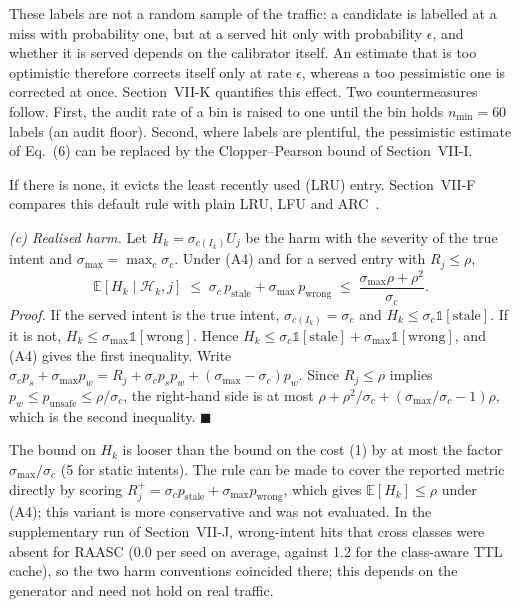 These labels are not a random sample of the traffic: a candidate is labelled at a miss with probability one, but at a served hit only with probability $\epsilon$, and whether it is served depends on the calibrator itself. An estimate that is too optimistic therefore corrects itself only at rate $\epsilon$, whereas a too pessimistic one is corrected at once. Section~VII-K quantifies this effect. Two countermeasures follow. First, the audit rate of a bin is raised to one until the bin holds $n_{\min}=60$ labels (an audit floor). Second, where labels are plentiful, the pessimistic estimate of Eq.~(6) can be replaced by the Clopper--Pearson bound of Section~VII-I.

If there is none, it evicts the least recently used (LRU) entry. Section~VII-F compares this default rule with plain LRU, LFU and ARC~\cite{megiddo2003arc}.


\emph{(c) Realised harm.} Let $H_k=\sigma_{c(I_k)}U_j$ be the harm with the severity of the true intent and $\sigma_{\max}=\max_c\sigma_c$. Under (A4) and for a served entry with $R_j\le\rho$,
\[
  \mathbb{E}[H_k\mid\mathcal{H}_k,j]\;\le\;\sigma_c\,p_{\mathrm{stale}}+\sigma_{\max}\,p_{\mathrm{wrong}}\;\le\;\frac{\sigma_{\max}\rho+\rho^{2}}{\sigma_c}.
\]
\emph{Proof.} If the served intent is the true intent, $\sigma_{c(I_k)}=\sigma_c$ and $H_k\le\sigma_c\mathbb{1}[\text{stale}]$. If it is not, $H_k\le\sigma_{\max}\mathbb{1}[\text{wrong}]$. Hence $H_k\le\sigma_c\mathbb{1}[\text{stale}]+\sigma_{\max}\mathbb{1}[\text{wrong}]$, and (A4) gives the first inequality. Write $\sigma_c p_s+\sigma_{\max}p_w=R_j+\sigma_c p_sp_w+(\sigma_{\max}-\sigma_c)p_w$. Since $R_j\le\rho$ implies $p_w\le p_{\mathrm{unsafe}}\le\rho/\sigma_c$, the right-hand side is at most $\rho+\rho^2/\sigma_c+(\sigma_{\max}/\sigma_c-1)\rho$, which is the second inequality. $\blacksquare$

The bound on $H_k$ is looser than the bound on the cost (1) by at most the factor $\sigma_{\max}/\sigma_c$ (5 for static intents). The rule can be made to cover the reported metric directly by scoring $R_j^{+}=\sigma_c p_{\mathrm{stale}}+\sigma_{\max}p_{\mathrm{wrong}}$, which gives $\mathbb{E}[H_k]\le\rho$ under (A4); this variant is more conservative and was not evaluated. In the supplementary run of Section~VII-J, wrong-intent hits that cross classes were absent for RAASC (0.0 per seed on average, against 1.2 for the class-aware TTL cache), so the two harm conventions coincided there; this depends on the generator and need not hold on real traffic.

